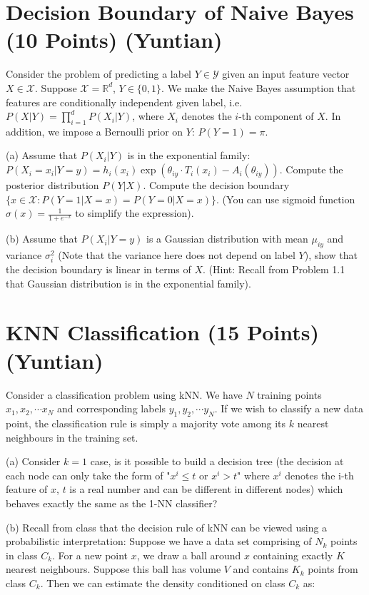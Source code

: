 \section{Decision Boundary of Naive Bayes (10 Points) (Yuntian)}
Consider the problem of predicting a label $Y \in \mathcal{Y}$ given an input feature vector $X \in \mathcal{X}$. Suppose $\mathcal{X} = \mathbb{R}^d$, $Y \in \{0, 1\}$. We make the Naive Bayes assumption that features are conditionally independent given label, i.e. $P(X | Y) = \prod_{i=1}^d P(X_i |Y)$, where $X_i$ denotes the $i$-th component of $X$. In addition, we impose a Bernoulli prior on $Y$: $P(Y=1) = \pi$. 

(a) Assume that $P(X_i | Y)$ is in the exponential family: $P(X_i = x_i | Y = y) = h_i(x_i) \exp (\theta_{iy} \cdot T_i(x_i) - A_{i}(\theta_{iy}))$. Compute the posterior distribution $P(Y | X)$. Compute the decision boundary $\{x \in \mathcal{X}: P(Y=1 | X = x) = P(Y=0 | X =x)\}$. (You can use sigmoid function $\sigma(x)=\frac{1}{1+e^{-x}}$ to simplify the expression).

(b) Assume that $P(X_i | Y=y)$ is a Gaussian distribution with mean $\mu_{iy}$ and variance $\sigma_{i}^2$ (Note that the variance here does not depend on label $Y$), show that the decision boundary is linear in terms of $X$. (Hint: Recall from Problem 1.1 that Gaussian distribution is in the exponential family).


\section{KNN Classification (15 Points) (Yuntian)}
Consider a classification problem using kNN. We have $N$ training points $x_1, x_2, \cdots x_N$ and corresponding labels $y_1, y_2, \cdots y_N$. If we wish to classify a new data point, the classification rule is simply a majority vote among its $k$ nearest neighbours in the training set.

(a) Consider $k=1$ case, is it possible to build a decision tree (the decision at each node can only take the form of {\color{red}"$x^i \le t$ or $x^i > t$" where $x^i$ denotes the i-th feature of $x$, $t$ is a real number and can be different in different nodes}) which behaves exactly the same as the 1-NN classifier?

(b) Recall from class that the decision rule of kNN can be viewed using a probabilistic interpretation: Suppose we have a data set comprising of $N_k$ points in class $C_k$. For a new point $x$, we draw a ball around $x$ containing exactly $K$ nearest neighbours. Suppose this ball has volume $V$ and contains $K_k$ points from class $C_k$. Then we can estimate the density conditioned on class $C_k$ as:


